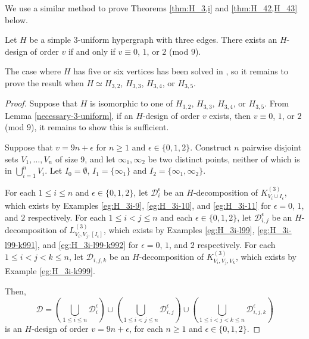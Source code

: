 We use a similar method to prove Theorems \ref{thm:H_3,i} and \ref{thm:H_42,H_43} below.

\begin{theorem} \label{thm:H_3,i}
Let $H$ be a simple $3$-uniform hypergraph with three edges.
There exists an $H$-design of order $v$ if and only if $v \equiv 0$, $1$, or $2$ (mod $9$).
\end{theorem}

The case where $H$ has five or six vertices has been solved in \cite{bryant},
so it remains to prove the result when $H \simeq H_{3,2}$, $H_{3,3}$, $H_{3,4}$, or $H_{3,5}$.

\begin{proof}
Suppose that $H$ is isomorphic to one of $H_{3,2}$, $H_{3,3}$, $H_{3,4}$, or $H_{3,5}$.
From Lemma \ref{necessary-3-uniform}, if an $H$-design of order $v$ exists, then $v \equiv 0$, $1$, or $2$ (mod $9$), it remains to show this is sufficient.

Suppose that $v = 9n + \epsilon$ for $n \geq 1$ and $\epsilon \in \{0,1,2\}$.
Construct $n$ pairwise disjoint sets $V_1, \ldots, V_n$ of size 9,
and let $\infty_1, \infty_2$ be two distinct points, neither of which is in $\bigcup_{i=1}^{n} V_i$.
Let $I_0 = \emptyset$, $I_1 = \{\infty_1\}$ and $I_2 = \{\infty_1, \infty_2\}$.

For each $1 \leq i \leq n$ and $\epsilon \in \{0,1,2\}$, let $\mathcal{D}_i^{\epsilon}$ be an $H$-decomposition of $K_{V_i \cup I_\epsilon}^{(3)}$,
which exists by Examples \ref{eg:H_3i-9}, \ref{eg:H_3i-10}, and \ref{eg:H_3i-11} for $\epsilon = 0$, $1$, and $2$ respectively.
%
For each $1 \leq i < j \leq n$ and each $\epsilon \in \{0,1,2\}$, let $\mathcal{D}_{i,j}^{\epsilon}$ be an $H$-decomposition of $L_{V_i, V_j, [I_\epsilon]}^{(3)}$, which exists by Examples \ref{eg:H_3i-l99}, \ref{eg:H_3i-l99-k991}, and \ref{eg:H_3i-l99-k992} for $\epsilon = 0$, $1$, and $2$ respectively.
%
For each $1 \leq i < j < k \leq n$, let $\mathcal{D}_{i,j,k}$ be an $H$-decomposition of $K_{V_i,V_j,V_k}^{(3)}$, which exists by Example \ref{eg:H_3i-k999}.

Then,
\[
    \mathcal{D} = \left( \bigcup_{1 \leq i \leq n} \mathcal{D}_{i}^{\epsilon} \right)
    \cup \left( \bigcup_{1 \leq i < j \leq n} \mathcal{D}_{i,j}^{\epsilon} \right)
    \cup \left( \bigcup_{1 \leq i < j < k \leq n} \mathcal{D}_{i,j,k}^{\epsilon} \right)
\]
is an $H$-design of order $v = 9n + \epsilon$, for each $n \geq 1$ and $\epsilon \in \{0,1,2\}$.
\end{proof}

